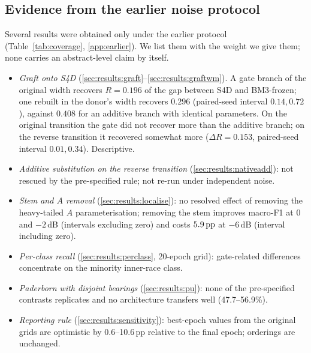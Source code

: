 \subsection{Evidence from the earlier noise protocol}
\label{sec:results:earlier}

Several results were obtained only under the earlier protocol (Table~\ref{tab:coverage}, \ref{app:earlier}). We list them with the weight we give them; none carries an abstract-level claim by itself.
\begin{itemize}
\item \emph{Graft onto S4D} (\ref{sec:results:graft}--\ref{sec:results:graftwm}). A gate branch of the original width recovers $R=0.196$ of the gap between S4D and BM3-frozen; one rebuilt in the donor's width recovers $0.296$ (paired-seed interval $0.14, 0.72$), against $0.408$ for an additive branch with identical parameters. On the original transition the gate did not recover more than the additive branch; on the reverse transition it recovered somewhat more ($\Delta R = 0.153$, paired-seed interval $0.01, 0.34$). Descriptive.
\item \emph{Additive substitution on the reverse transition} (\ref{sec:results:nativeadd}): not rescued by the pre-specified rule; not re-run under independent noise.
\item \emph{Stem and $A$ removal} (\ref{sec:results:localise}): no resolved effect of removing the heavy-tailed $A$ parameterisation; removing the stem improves macro-F1 at $0$ and $-2$\,dB (intervals excluding zero) and costs $5.9\,\mathrm{pp}$ at $-6$\,dB (interval including zero).
\item \emph{Per-class recall} (\ref{sec:results:perclass}, 20-epoch grid): gate-related differences concentrate on the minority inner-race class.
\item \emph{Paderborn with disjoint bearings} (\ref{sec:results:pu}): none of the pre-specified contrasts replicates and no architecture transfers well (47.7--56.9\%).
\item \emph{Reporting rule} (\ref{sec:results:sensitivity}): best-epoch values from the original grids are optimistic by 0.6--10.6\,pp relative to the final epoch; orderings are unchanged.
\end{itemize}
